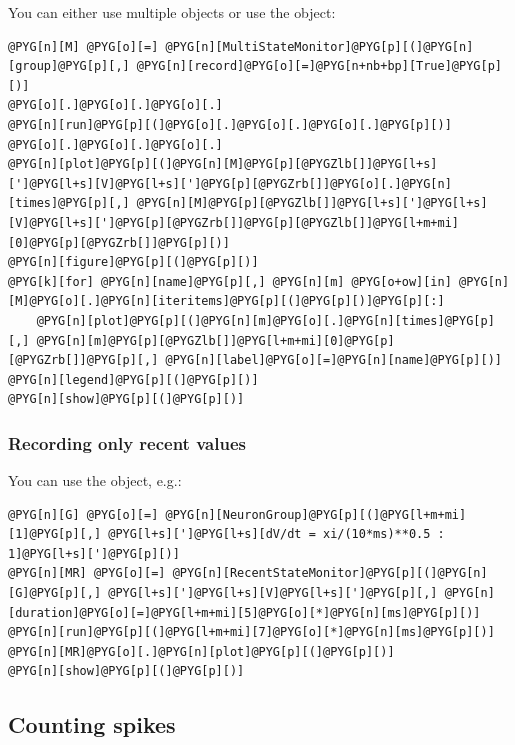 \documentclass[letterpaper,10pt,english]{manual}
\begin{document}
You can either use multiple \hyperlink{brian.StateMonitor}{} objects or use the \hyperlink{brian.MultiStateMonitor}{}
object:

\begin{Verbatim}[commandchars=@\[\]]
@PYG[n][M] @PYG[o][=] @PYG[n][MultiStateMonitor]@PYG[p][(]@PYG[n][group]@PYG[p][,] @PYG[n][record]@PYG[o][=]@PYG[n+nb+bp][True]@PYG[p][)]
@PYG[o][.]@PYG[o][.]@PYG[o][.]
@PYG[n][run]@PYG[p][(]@PYG[o][.]@PYG[o][.]@PYG[o][.]@PYG[p][)]
@PYG[o][.]@PYG[o][.]@PYG[o][.]
@PYG[n][plot]@PYG[p][(]@PYG[n][M]@PYG[p][@PYGZlb[]]@PYG[l+s][']@PYG[l+s][V]@PYG[l+s][']@PYG[p][@PYGZrb[]]@PYG[o][.]@PYG[n][times]@PYG[p][,] @PYG[n][M]@PYG[p][@PYGZlb[]]@PYG[l+s][']@PYG[l+s][V]@PYG[l+s][']@PYG[p][@PYGZrb[]]@PYG[p][@PYGZlb[]]@PYG[l+m+mi][0]@PYG[p][@PYGZrb[]]@PYG[p][)]
@PYG[n][figure]@PYG[p][(]@PYG[p][)]
@PYG[k][for] @PYG[n][name]@PYG[p][,] @PYG[n][m] @PYG[o+ow][in] @PYG[n][M]@PYG[o][.]@PYG[n][iteritems]@PYG[p][(]@PYG[p][)]@PYG[p][:]
    @PYG[n][plot]@PYG[p][(]@PYG[n][m]@PYG[o][.]@PYG[n][times]@PYG[p][,] @PYG[n][m]@PYG[p][@PYGZlb[]]@PYG[l+m+mi][0]@PYG[p][@PYGZrb[]]@PYG[p][,] @PYG[n][label]@PYG[o][=]@PYG[n][name]@PYG[p][)]
@PYG[n][legend]@PYG[p][(]@PYG[p][)]
@PYG[n][show]@PYG[p][(]@PYG[p][)]
\end{Verbatim}


\subsubsection{Recording only recent values}

You can use the \hyperlink{brian.RecentStateMonitor}{} object, e.g.:

\begin{Verbatim}[commandchars=@\[\]]
@PYG[n][G] @PYG[o][=] @PYG[n][NeuronGroup]@PYG[p][(]@PYG[l+m+mi][1]@PYG[p][,] @PYG[l+s][']@PYG[l+s][dV/dt = xi/(10*ms)**0.5 : 1]@PYG[l+s][']@PYG[p][)]
@PYG[n][MR] @PYG[o][=] @PYG[n][RecentStateMonitor]@PYG[p][(]@PYG[n][G]@PYG[p][,] @PYG[l+s][']@PYG[l+s][V]@PYG[l+s][']@PYG[p][,] @PYG[n][duration]@PYG[o][=]@PYG[l+m+mi][5]@PYG[o][*]@PYG[n][ms]@PYG[p][)]
@PYG[n][run]@PYG[p][(]@PYG[l+m+mi][7]@PYG[o][*]@PYG[n][ms]@PYG[p][)]
@PYG[n][MR]@PYG[o][.]@PYG[n][plot]@PYG[p][(]@PYG[p][)]
@PYG[n][show]@PYG[p][(]@PYG[p][)]
\end{Verbatim}


\subsection{Counting spikes}
\end{document}
